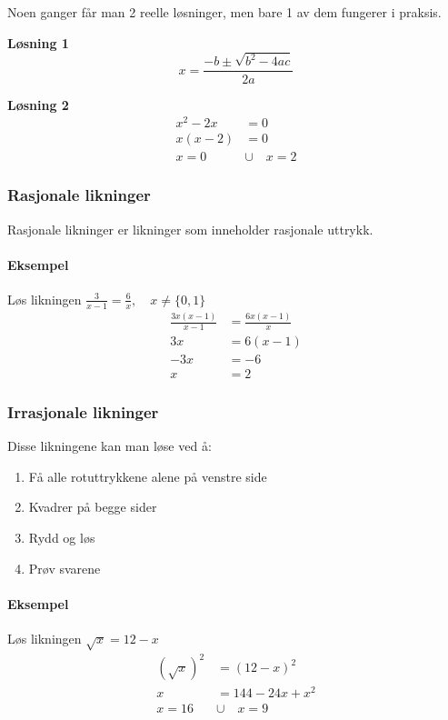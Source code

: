 \documentclass[12pt,norsk,a4paper]{article}
\begin{document}
Noen ganger får man 2 reelle løsninger, men bare 1 av dem fungerer i praksis.

\textbf{Løsning 1}
\begin{equation}
x = \frac{-b \pm \sqrt{b^{2} -4ac} }{2a}
\end{equation}

\textbf{Løsning 2}
\begin{align*}
x^{2} - 2x &= 0	\\
x(x - 2) &= 0	\\
x = 0 \quad &\cup \quad x = 2
\end{align*}

\subsubsection{Rasjonale likninger}
Rasjonale likninger er likninger som inneholder rasjonale uttrykk.

\paragraph*{Eksempel} Løs likningen $\frac{3}{x - 1} = \frac{6}{x}, \quad x \neq \{ 0,1 \}$
\begin{align*}
\frac{3x(x-1)}{x-1} &= \frac{6x(x-1)}{x}				\\
3x &= 6(x - 1)											\\
-3x &= -6												\\
x &= 2
\end{align*}

\newpage








\subsubsection{Irrasjonale likninger}
Disse likningene kan man løse ved å:

\begin{enumerate}
\item Få alle rotuttrykkene alene på venstre side
\item Kvadrer på begge sider
\item Rydd og løs
\item Prøv svarene
\end{enumerate}

\paragraph*{Eksempel} Løs likningen $\sqrt{x} = 12 - x$
\begin{align*}
(\sqrt{x})^{2} &= (12 - x)^{2}	\\
x &= 144 - 24x + x^{2}			\\
x = 16 \quad &\cup \quad x = 9
\end{align*}
\end{document}
